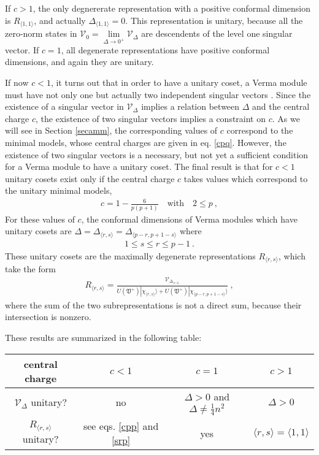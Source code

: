 \documentclass[12pt,a4paper,notitlepage]{report}
\numberwithin{equation}{section}
\theoremstyle{break}
\begin{document}
If $c > 1$, the only degnererate representation with a positive conformal dimension is $R_{\langle 1,1 \rangle}$, and actually $\Delta_{\langle 1,1 \rangle}=0$. This representation is unitary, because all the zero-norm states in $\mathcal{V}_0 = \underset{\Delta \rightarrow 0^+}{\lim} \mathcal{V}_\Delta$ are descendents of the level one singular vector. If $c=1$, all degenerate representations have positive conformal dimensions, and again they are unitary.

If now $c<1$, it turns out that in order to have a unitary coset, a Verma module must have not only one but actually two independent singular vectors \cite{fms97}. 
Since the existence of a singular vector in $\mathcal{V}_\Delta$ implies a relation between $\Delta$ and the central charge $c$, the existence of two singular vectors implies a constraint on $c$. 
As we will see in Section \ref{secamm}, the corresponding values of $c$ correspond to the minimal models, whose central charges are given in eq. \eqref{cpq}. 
However, the existence of two singular vectors is a necessary, but not yet a sufficient condition for a Verma module to have a unitary coset.
The final result is that for $c<1$ unitary cosets exist only if the central charge $c$ takes values which correspond to the unitary minimal models,
\begin{align}
 c = 1-\frac{6}{p(p+1)}  \quad \text{with} \quad 2\leq p\ ,
\label{cpp}
\end{align}
For these values of $c$,
the conformal dimensions of Verma modules which have unitary cosets are $\Delta=\Delta_{\langle r,s \rangle}=\Delta_{\langle p-r, p+1-s \rangle}$ where
\begin{align}
   1\leq s\leq r\leq p-1 \ .
\label{srp}
\end{align}
These unitary cosets are the maximally degenerate representations $R_{\langle r,s \rangle}$, which take the form
\begin{align}
 R_{\langle r,s \rangle} = \frac{\mathcal{V}_{\Delta_{\langle r,s \rangle}}}{U(\mathfrak{V}^+)|\chi_{\langle r,s \rangle}\rangle + U(\mathfrak{V}^+)|\chi_{\langle p-r,p+1-s \rangle}\rangle}\ ,
\label{rrs}
\end{align}
where the sum of the two subrepresentations is not a direct sum, because their intersection is nonzero. 

These results are summarized in the following table:
\begin{center}
 \begin{tabular}{|c|c|c|c|}
  \hline
central charge & $c<1$ & $c=1$ & $c>1$
\\
\hline
$\mathcal{V}_\Delta$ unitary? & no & $\Delta>0$ and $\Delta \neq \frac14 n^2$ & $\Delta>0$
\\
\hline
$R_{\langle r,s\rangle}$ unitary? & see eqs. \eqref{cpp} and \eqref{srp} &  yes & $\langle r,s \rangle = \langle 1,1\rangle$
\\
\hline
 \end{tabular}
\end{center}
\end{document}
